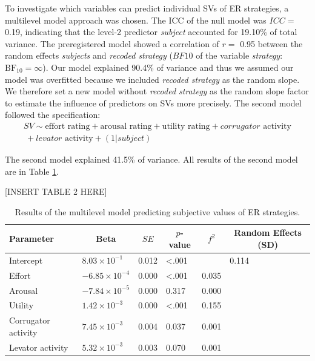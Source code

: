 \documentclass[
  man,floatsintext]{apa6}
\begin{document}
To investigate which variables can predict individual SVs of ER strategies, a multilevel model approach was chosen.
The ICC of the null model was \(ICC=\) 0.19, indicating that the level-2 predictor \emph{subject} accounted for 19.10\% of total variance.
The preregistered model showed a correlation of \(r=\) 0.95 between the random effects \emph{subjects} and \emph{recoded strategy} (\(BF10\) of the variable \emph{strategy}: \(\mathrm{BF}_{\textrm{10}} = \infty\)).
Our model explained 90.4\% of variance and thus we assumed our model was overfitted because we included \emph{recoded strategy} as the random slope.
We therefore set a new model without \emph{recoded strategy} as the random slope factor to estimate the influence of predictors on SVs more precisely.
The second model followed the specification:
\[
\begin{split}
SV \sim \text{effort rating} + \text{arousal rating} + \text{utility rating} + corrugator \text{ activity} \\\ + levator \text{ activity} + (1 |subject)
\end{split}
\]

The second model explained 41.5\% of variance.
All results of the second model are in Table \ref{tab:TabMLMH5}.

{[}INSERT TABLE 2 HERE{]}

\begin{table}[H]

\begin{center}
\begin{threeparttable}

\caption{\label{tab:TabMLMH5}Results of the multilevel model predicting subjective values of ER strategies.}

\begin{tabular}{llllll}
\toprule
Parameter & \multicolumn{1}{c}{Beta} & \multicolumn{1}{c}{$SE$} & \multicolumn{1}{c}{$p$-value} & \multicolumn{1}{c}{$f^{2}$} & \multicolumn{1}{c}{Random Effects (SD)}\\
\midrule
Intercept & $8.03 \times 10^{-1}$ & 0.012 & <.001 &  & 0.114\\
Effort & $-6.85 \times 10^{-4}$ & 0.000 & <.001 & 0.035 & \\
Arousal & $-7.84 \times 10^{-5}$ & 0.000 & 0.317 & 0.000 & \\
Utility & $1.42 \times 10^{-3}$ & 0.000 & <.001 & 0.155 & \\
Corrugator activity & $7.45 \times 10^{-3}$ & 0.004 & 0.037 & 0.001 & \\
Levator activity & $5.32 \times 10^{-3}$ & 0.003 & 0.070 & 0.001 & \\
\bottomrule
\end{tabular}

\end{threeparttable}
\end{center}

\end{table}
\end{document}
